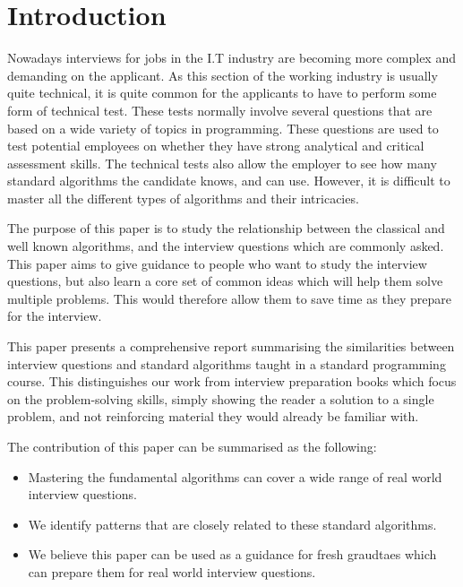 \documentclass[10pt,twocolumn,hidelinks]{IEEEtran}
\begin{document}
\section{Introduction}
\label{sec:intro}
\par
Nowadays interviews for jobs in the I.T industry are becoming more complex and demanding on the applicant. As this section of the working industry is usually quite technical, it is quite common for the applicants to have to perform some form of technical test. These tests normally involve several questions that are based on a wide variety of topics in programming. These questions are used to test potential employees on whether they have strong analytical and critical assessment skills. The technical tests also allow the employer to see how many standard algorithms the candidate knows, and can use. However, it is difficult to master all the different types of algorithms and their intricacies. 
\par The purpose of this paper is to study the relationship between the classical and well known algorithms, and the interview questions which are commonly asked.  This paper aims to give guidance to people who want to study the interview questions, but also learn a core set of common ideas which will help them solve multiple problems. This would therefore allow them to save time as they prepare for the interview.
\par This paper presents a comprehensive report summarising the similarities between interview questions and standard algorithms taught in a standard programming course. This distinguishes our work from interview preparation books which focus on the problem-solving skills, simply showing the reader a solution to a single problem, and not reinforcing material they would already be familiar with. 
\par The contribution of this paper can be summarised as the following: 
\begin{itemize}
\item Mastering the fundamental algorithms can cover a wide range of real world interview questions. 
\item We identify patterns that are closely related to these standard algorithms. 
\item We believe this paper can be used as a guidance for fresh graudtaes which can prepare them for real world interview questions.  
\end{itemize}
\end{document}
